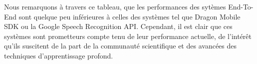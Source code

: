 Nous remarquons à travers ce tableau, que les performances des sytèmes End-To-End sont quelque peu inférieures à celles des systèmes tel que Dragon Mobile SDK ou la Google Speech Recognition API. Cependant, il est clair que ces systèmes sont prometteurs compte tenu de leur performance actuelle, de l'intérêt qu'ils suscitent de la part de la communauté scientifique et des avancées des techniques d'apprentissage profond.






